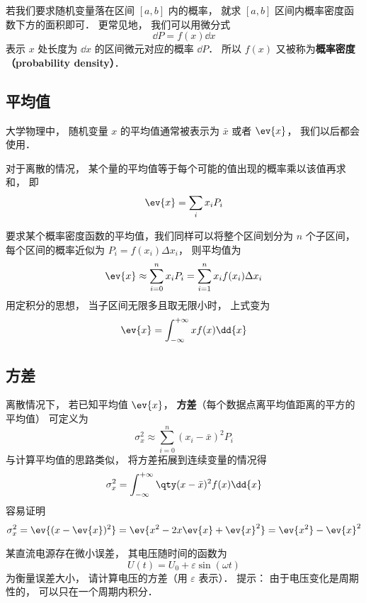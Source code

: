 若我们要求随机变量落在区间 $[a,b]$ 内的概率， 就求 $[a,b]$ 区间内概率密度函数下方的面积即可． 更常见地， 我们可以用微分式
\begin{equation}
\dd{P} = f(x) \dd{x}
\end{equation}
表示 $x$ 处长度为 $\dd{x}$ 的区间微元对应的概率 $\dd{P}$． 所以 $f(x)$ 又被称为\textbf{概率密度（probability density）}．

\subsection{平均值}
大学物理中， 随机变量 $x$ 的平均值通常被表示为 $\bar x$ 或者 $\ev{x}$， 我们以后都会使用．

对于离散的情况， 某个量的平均值等于每个可能的值出现的概率乘以该值再求和， 即
\begin{equation}\label{RandF_eq14}
\ev{x} = \sum_i x_i P_i
\end{equation}

要求某个概率密度函数的平均值，我们同样可以将整个区间划分为 $n$ 个子区间， 每个区间的概率近似为 $P_i = f(x_i) \Delta x_i$， 则平均值为
\begin{equation}
\ev{x} \approx \sum_{i=0}^n x_i P_i = \sum_{i=1}^n x_i f(x_i) \Delta x_i
\end{equation}
用定积分的思想， 当子区间无限多且取无限小时， 上式变为
\begin{equation}\label{RandF_eq7}
\ev{x} = \int_{-\infty}^{+\infty} x f(x) \dd{x}
\end{equation}

\subsection{方差}
离散情况下， 若已知平均值 $\ev{x}$， \textbf{方差}（每个数据点离平均值距离的平方的平均值） 可定义为
\begin{equation}
\sigma_x^2 \approx \sum_{i=0}^n (x_i - \bar x)^2 P_i
\end{equation}
与计算平均值的思路类似， 将方差拓展到连续变量的情况得
\begin{equation}\label{RandF_eq6}
\sigma_x^2 = \int_{-\infty}^{+\infty} \qty(x-\bar x)^2 f(x) \dd{x}
\end{equation}
容易证明
\begin{equation}\label{RandF_eq15}
\sigma_x^2=\ev{(x-\ev{x})^2}=\ev{x^2-2x\ev{x}+\ev{x}^2}=\ev{x^2}-\ev{x}^2
\end{equation}

\begin{exercise}{}
某直流电源存在微小误差， 其电压随时间的函数为
\begin{equation}
U(t) = U_0 + \varepsilon \sin(\omega t)
\end{equation}
为衡量误差大小， 请计算电压的方差（用 $\varepsilon$ 表示）． 提示： 由于电压变化是周期性的， 可以只在一个周期内积分．
\end{exercise}


